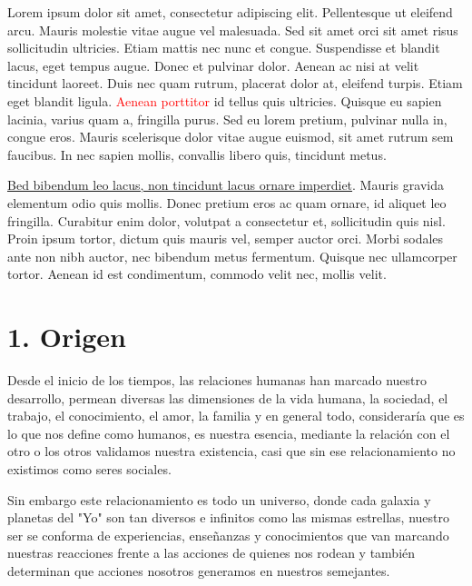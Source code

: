 \documentclass[11pt,letterpaper]{article}
\begin{document}
Lorem ipsum dolor sit amet, consectetur adipiscing elit. Pellentesque ut eleifend arcu. Mauris molestie vitae augue vel malesuada. Sed sit amet orci sit amet risus sollicitudin ultricies. Etiam mattis nec nunc et congue. Suspendisse et blandit lacus, eget tempus augue. Donec et pulvinar dolor. Aenean ac nisi at velit tincidunt laoreet. Duis nec quam rutrum, placerat dolor at, eleifend turpis. Etiam eget blandit ligula. \textcolor{red}{Aenean porttitor} id tellus quis ultricies. Quisque eu sapien lacinia, varius quam a, fringilla purus. Sed eu lorem pretium, pulvinar nulla in, congue eros. Mauris scelerisque dolor vitae augue euismod, sit amet rutrum sem faucibus. In nec sapien mollis, convallis libero quis, tincidunt metus.

\underline{Bed bibendum leo lacus, non tincidunt lacus ornare imperdiet}. Mauris gravida elementum odio quis mollis. Donec pretium eros ac quam ornare, id aliquet leo fringilla. Curabitur enim dolor, volutpat a consectetur et, sollicitudin quis nisl. Proin ipsum tortor, dictum quis mauris vel, semper auctor orci. Morbi sodales ante non nibh auctor, nec bibendum metus fermentum. Quisque nec ullamcorper tortor. Aenean id est condimentum, commodo velit nec, mollis velit.


\section{1. Origen }


Desde el inicio de los tiempos, las relaciones humanas han marcado nuestro desarrollo, permean diversas las dimensiones de la vida humana, la sociedad, el trabajo, el conocimiento, el amor, la familia y en general todo, consideraría que es lo que nos define como humanos, es nuestra esencia, mediante la relación con el otro o los otros validamos nuestra existencia, casi que sin ese relacionamiento no existimos como seres sociales.

Sin embargo este relacionamiento es todo un universo, donde cada galaxia y planetas del "Yo" son tan diversos e infinitos como las mismas estrellas, nuestro ser se conforma de experiencias, enseñanzas y conocimientos que van marcando nuestras reacciones frente a las acciones de quienes nos rodean y también determinan que acciones nosotros generamos en nuestros semejantes. 
\end{document}
